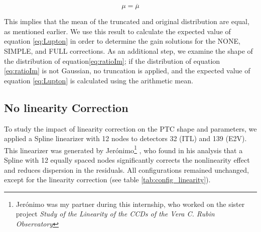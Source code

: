 \begin{itemize}
    \begin{equation}
        \mu = \overline{\mu}
        \label{eq:truncated_dist_simetric}
    \end{equation}

    This implies that the mean of the truncated and original distribution are equal, as mentioned earlier. We use this result to calculate the expected value of equation \ref{eq:Lupton} in order to determine the gain solutions for the NONE, SIMPLE, and FULL corrections. As an additional step, we examine the shape of the distribution of equation\ref{eq:ratioIm}; if the distribution of equation \ref{eq:ratioIm} is not Gaussian, no truncation is applied, and the expected value of equation \ref{eq:Lupton} is calculated using the arithmetic mean.

\end{itemize}


\subsection{No linearity Correction} \label{subsec:method_Linearity}

To study the impact of linearity correction on the PTC shape and parameters, we applied a Spline linearizer with 12 nodes to detectors 32 (ITL) and 139 (E2V). This linearizer was generated by Jerónimo\footnote{Jerónimo was my partner during this internship, who worked on the sister project \textit{Study of the Linearity of the CCDs of the Vera C. Rubin Observatory}} , who found in his analysis that a Spline with 12 equally spaced nodes significantly corrects the nonlinearity effect and reduces dispersion in the residuals. All configurations remained unchanged, except for the linearity correction (see table \ref{tab:config_linearity}).


\begin{table}[!htb]
\centering
\caption{The configuration used to generate the PTCs when we include the linearity correction (the parameter 'doLinearize' is set to 'true').}
\label{tab:config_linearity}
\end{table}

